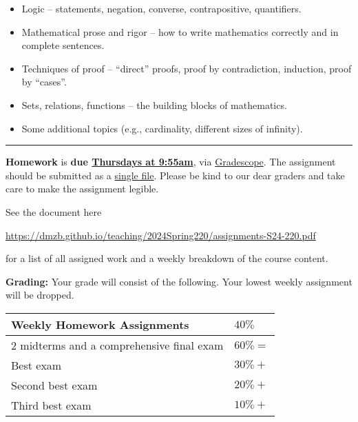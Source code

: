 \documentclass[12pt]{article}
\begin{document}
\begin{itemize}
\item Logic -- statements, negation, converse, contrapositive, quantifiers. \vspace{-5pt}
\item Mathematical prose and rigor -- how to write mathematics
 correctly and in complete sentences.\vspace{-5pt}
\item Techniques of proof -- ``direct'' proofs, proof by contradiction, induction, proof by ``cases''. \vspace{-5pt}
\item Sets, relations, functions -- the building blocks of mathematics. \vspace{-5pt}
\item Some additional topics (e.g., cardinality, different sizes of infinity).
\end{itemize}

\smallskip \hrule \medskip

\noindent \textbf{Homework} is \textbf{due \underline{Thursdays at 9:55am}}, via \underline{Gradescope}. The assignment should be submitted as a \underline{single file}. Please be kind to our dear graders and take care to make the assignment legible.
\smallskip

\noindent See the document here
\begin{center}
 \url{https://dmzb.github.io/teaching/2024Spring220/assignments-S24-220.pdf}
\end{center}
for a list of all assigned work and a weekly breakdown of the course content.
\medskip

\noindent\begin{minipage}{\textwidth}
\noindent\textbf{Grading:}
Your grade will consist of the following. Your lowest weekly assignment will be dropped.

\begin{center}
 \begin{tabular}{|l|l|}
 \hline
 Weekly Homework Assignments & $40\%$ \\
 \hline
 2 midterms and a comprehensive final exam & $60\% = $ 	 \\
 Best exam & $30\% + $ 	 \\
 Second best exam& $20\% + $ 	 \\
 Third best exam & $10\% + $ 	 \\
 \hline
 \end{tabular}
\end{center}
\end{minipage}
\end{document}
